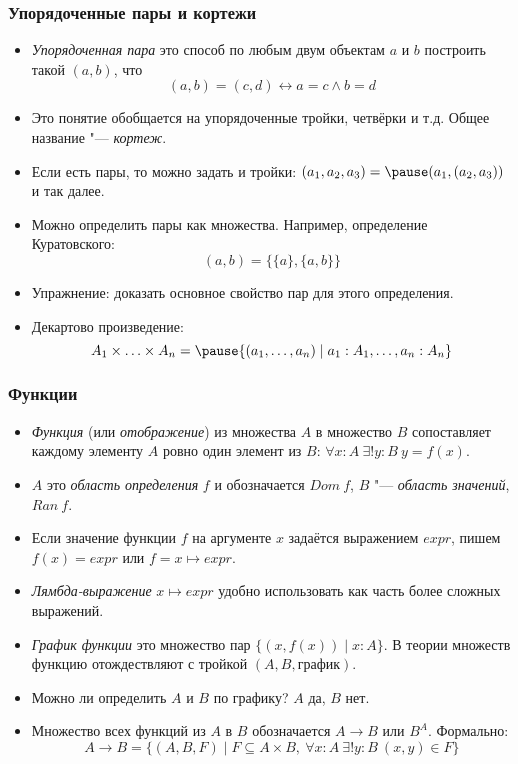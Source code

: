 \documentclass[10pt]{beamer}
\begin{document}
\begin{frame}
    \frametitle{Упорядоченные пары и кортежи}
    \begin{itemize}
        \item \emph{Упорядоченная пара} это способ по любым двум объектам $a$ и $b$ построить такой $(a,b)$, что \pause
        $$(a,b) = (c,d) \leftrightarrow a = c \land b = d$$
        \item Это понятие обобщается на упорядоченные тройки, четвёрки и т.д. Общее название "--- \emph{кортеж}.
        \item Если есть пары, то можно задать и тройки: $(a_1, a_2, a_3) = \pause (a_1, (a_2, a_3))$ и так далее.
        \item Можно определить пары как множества. Например, определение Куратовского: $$(a, b) = \{\{a\}, \{a, b\}\}$$
        \item Упражнение: доказать основное свойство пар для этого определения.
        \item Декартово произведение: $$A_1 \times \ldots \times A_n = \pause \{(a_1, \ldots, a_n) \mid a_1 : A_1, \ldots, a_n : A_n\}$$
    \end{itemize}
\end{frame}

\begin{frame}
    \frametitle{Функции}
    \begin{itemize}
        \item \emph{Функция} (или \emph{отображение}) из множества $A$ в множество $B$ сопоставляет каждому элементу $A$ ровно один элемент из $B$:
        $\forall x : A ~ \exists ! y : B ~ y=f(x)$.
        \item $A$ это \emph{область определения} $f$ и обозначается $Dom\ f$, $B$ "--- \emph{область значений}, $Ran\ f$.
        \pause
        \item Если значение функции $f$ на аргументе $x$ задаётся выражением $expr$, пишем $f(x) = expr$ или $f = x \mapsto expr$. 
        \item \emph{Лямбда-выражение} $x \mapsto expr$ удобно использовать как часть более сложных выражений.
        \pause
        \item \emph{График функции} это множество пар $\{(x, f(x)) \mid x : A\}$. В теории множеств функцию отождествляют с тройкой $(A,B,\text{график})$.
        \item Можно ли определить $A$ и $B$ по графику? \pause $A$ да, $B$ нет.
        \pause
        \item Множество всех функций из $A$ в $B$ обозначается $A \to B$ или $B^A$. Формально:
        $$A \to B = \{(A,B,F) \mid F \subseteq A \times B, ~ \forall x : A ~ \exists ! y : B ~ (x,y) \in F\}$$
    \end{itemize}
\end{frame}
\end{document}
